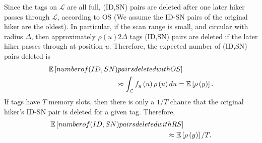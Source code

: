 \documentclass[conference]{IEEEtran}
\begin{document}
Since the tags on $\mathcal{L}$ are all full, (ID,SN) pairs are deleted after one later hiker passes through $\mathcal{L}$, according to OS (We assume the ID-SN pairs of the original hiker are the oldest).  In particular, if the scan range is small, and circular with radius $\Delta$, then approximately $\rho\left(u\right) 2 \Delta$ tags (ID,SN) pairs are deleted if the later hiker passes through at position $u$.  Therefore, the expected number of (ID,SN) pairs deleted is
\begin{eqnarray}
\mathbb{E} \left[ \mbox{number of (ID,SN) pairs deleted with OS} \right] \hspace{.6in}  \nonumber \\
 \approx  \int_{\mathcal{L}} f_y\left(u\right) \rho\left(u\right) du = \mathbb{E} \left[ \rho \left(y \right) \right].
\end{eqnarray}
If tags have $T$ memory slots, then there is only a $1/T$ chance that the original hiker's ID-SN pair is deleted for a given tag.  Therefore,
\begin{eqnarray}
\mathbb{E} \left[ \mbox{number of (ID,SN) pairs deleted with RS} \right] \hspace{.55in}  \nonumber \\
 \approx \mathbb{E} \left[ \rho \left(y \right) \right]/T.
\end{eqnarray}
\end{document}
